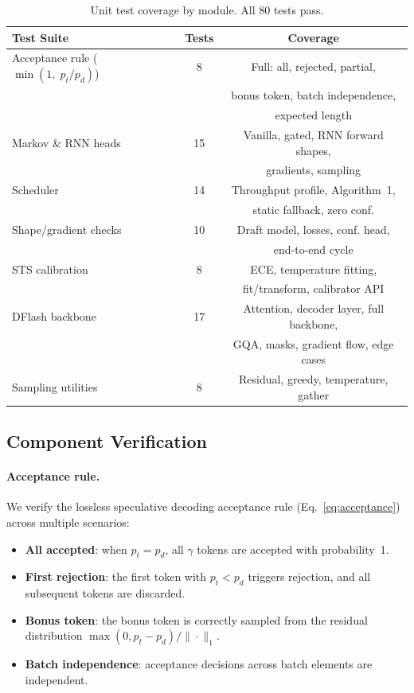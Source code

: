 \documentclass[11pt,a4paper]{article}
\begin{document}
\begin{table}[t]
\centering
\small
\caption{Unit test coverage by module. All 80 tests pass.}
\label{tab:tests}
\begin{tabular}{lcc}
\toprule
Test Suite & Tests & Coverage \\
\midrule
Acceptance rule ($\min(1,\; p_t/p_d)$) & 8 & Full: all, rejected, partial,\\
 & & bonus token, batch independence,\\
 & & expected length \\
Markov \& RNN heads & 15 & Vanilla, gated, RNN forward shapes,\\
 & & gradients, sampling \\
Scheduler & 14 & Throughput profile, Algorithm~1,\\
 & & static fallback, zero conf. \\
Shape/gradient checks & 10 & Draft model, losses, conf. head,\\
 & & end-to-end cycle \\
STS calibration & 8 & ECE, temperature fitting,\\
 & & fit/transform, calibrator API \\
DFlash backbone & 17 & Attention, decoder layer, full backbone,\\
 & & GQA, masks, gradient flow, edge cases \\
Sampling utilities & 8 & Residual, greedy, temperature, gather \\
\bottomrule
\end{tabular}
\end{table}

\subsection{Component Verification}
\label{subsec:component-verification}

\paragraph{Acceptance rule.}
We verify the lossless speculative decoding acceptance rule
(Eq.~\ref{eq:acceptance}) across multiple scenarios:
\begin{itemize}
  \item \textbf{All accepted}: when $p_t = p_d$, all $\gamma$ tokens are
    accepted with probability~1.
  \item \textbf{First rejection}: the first token with $p_t < p_d$ triggers
    rejection, and all subsequent tokens are discarded.
  \item \textbf{Bonus token}: the bonus token is correctly sampled from the
    residual distribution $\max(0, p_t - p_d) / \| \cdot \|_1$.
  \item \textbf{Batch independence}: acceptance decisions across batch
    elements are independent.
\end{itemize}
\end{document}
